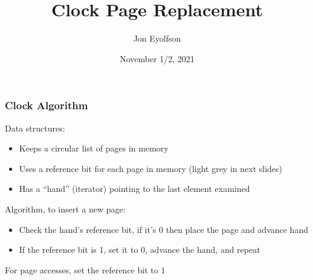 

\title{Clock Page Replacement}
\author{Jon Eyolfson}
\date{November 1/2, 2021}



  \begin{frame}
    \titlepage
  \end{frame}

  \begin{frame}
    \frametitle{Clock Algorithm}

    Data structures:
    \begin{itemize}
      \item Keeps a circular list of pages in memory
      \item Uses a reference bit for each page in memory (light grey in next slides)
      \item Has a ``hand'' (iterator) pointing to the last element examined
    \end{itemize}

    \vspace{2em}

    Algorithm, to insert a new page:
    \begin{itemize}
      \item Check the hand's reference bit, if it's 0 then place the page and advance hand
      \item If the reference bit is 1, set it to 0, advance the hand, and repeat
    \end{itemize}

    \vspace{2em}

    For page accesses, set the reference bit to 1
  \end{frame}

